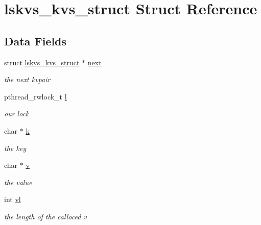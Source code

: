 \hypertarget{structlskvs__kvs__struct}{
\section{lskvs\_\-kvs\_\-struct Struct Reference}
\label{structlskvs__kvs__struct}
}
\subsection*{Data Fields}
\begin{DoxyCompactItemize}
\item 
struct \hyperlink{structlskvs__kvs__struct}{lskvs\_\-kvs\_\-struct} $\ast$ \hyperlink{structlskvs__kvs__struct_a6302f184418962708bd1efe3320d4347}{next}
\begin{DoxyCompactList}\small\item\em the next kvpair \item\end{DoxyCompactList}\item 
pthread\_\-rwlock\_\-t \hyperlink{structlskvs__kvs__struct_a45129c7f3d0bb2efc83b8a0d7ea2d814}{l}
\begin{DoxyCompactList}\small\item\em our lock \item\end{DoxyCompactList}\item 
char $\ast$ \hyperlink{structlskvs__kvs__struct_afaaab7729ce9dbabd8f3e2c502a8e4c5}{k}
\begin{DoxyCompactList}\small\item\em the key \item\end{DoxyCompactList}\item 
char $\ast$ \hyperlink{structlskvs__kvs__struct_a27a0ae4415b6d65c8a9f9fac11c130f9}{v}
\begin{DoxyCompactList}\small\item\em the value \item\end{DoxyCompactList}\item 
int \hyperlink{structlskvs__kvs__struct_aa1c980ae62cdf78d8b358b3a51deda6a}{vl}
\begin{DoxyCompactList}\small\item\em the length of the calloced v \item\end{DoxyCompactList}\end{DoxyCompactItemize}


